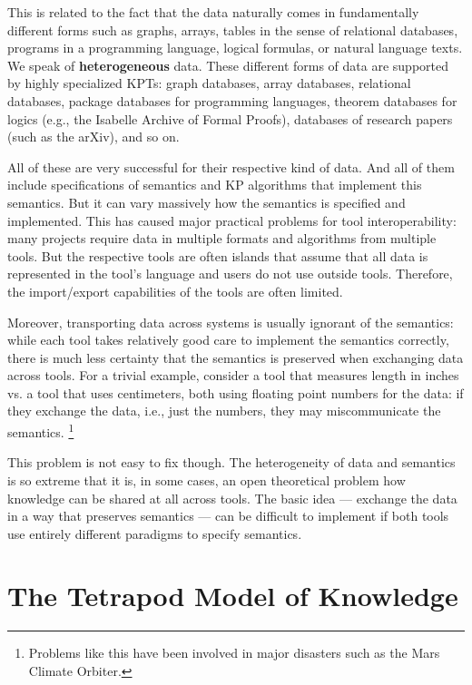 This is related to the fact that the data naturally comes in fundamentally different forms such as graphs, arrays, tables in the sense of relational databases, programs in a programming language, logical formulas, or natural language texts.
We speak of \textbf{heterogeneous} data.
These different forms of data are supported by highly specialized KPTs: graph databases, array databases, relational databases, package databases for programming languages, theorem databases for logics (e.g., the Isabelle Archive of Formal Proofs), databases of research papers (such as the arXiv), and so on.

All of these are very successful for their respective kind of data.
And all of them include specifications of semantics and KP algorithms that implement this semantics.
But it can vary massively how the semantics is specified and implemented.
This has caused major practical problems for tool interoperability: many projects require data in multiple formats and algorithms from multiple tools.
But the respective tools are often islands that assume that all data is represented in the tool's language and users do not use outside tools.
Therefore, the import/export capabilities of the tools are often limited.

Moreover, transporting data across systems is usually ignorant of the semantics: while each tool takes relatively good care to implement the semantics correctly, there is much less certainty that the semantics is preserved when exchanging data across tools.
For a trivial example, consider a tool that measures length in inches vs. a tool that uses centimeters, both using floating point numbers for the data: if they exchange the data, i.e., just the numbers, they may miscommunicate the semantics.%
\footnote{Problems like this have been involved in major disasters such as the Mars Climate Orbiter.} 

This problem is not easy to fix though.
The heterogeneity of data and semantics is so extreme that it is, in some cases, an open theoretical problem how knowledge can be shared at all across tools.
The basic idea --- exchange the data in a way that preserves semantics --- can be difficult to implement if both tools use entirely different paradigms to specify semantics.

\section{The Tetrapod Model of Knowledge}

